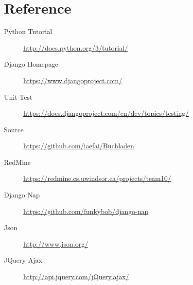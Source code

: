 \documentclass[11pt]{article}
\begin{document}
\section{Reference}
\label{sec-reference}

\begin{description}
\item[Python Tutorial] \href{http://docs.python.org/3/tutorial/}{http://docs.python.org/3/tutorial/}
\item[Django Homepage] \href{https://www.djangoproject.com/}{https://www.djangoproject.com/}
\item[Unit Test] \href{https://docs.djangoproject.com/en/dev/topics/testing/}{https://docs.djangoproject.com/en/dev/topics/testing/}
\item[Source] \href{https://github.com/iaefai/Buchladen}{https://github.com/iaefai/Buchladen}
\item[RedMine]
  \href{https://redmine.cs.uwindsor.ca/projects/team10/}{https://redmine.cs.uwindsor.ca/projects/team10/}
\item[Django Nap] \href{https://github.com/funkybob/django-nap}{https://github.com/funkybob/django-nap}
\item[Json] \href{http://www.json.org/}{http://www.json.org/}
\item[JQuery-Ajax] \href{http://api.jquery.com/jQuery.ajax/}{http://api.jquery.com/jQuery.ajax/}
\end{description}
\end{document}
